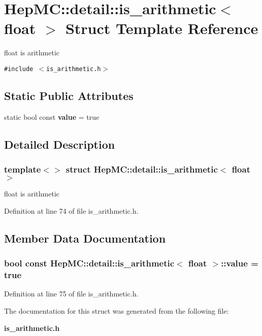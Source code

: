 \section{Hep\-MC::detail::is\_\-arithmetic$<$ float $>$ Struct Template Reference}
\label{structHepMC_1_1detail_1_1is__arithmetic_3_01float_01_4}
float is arithmetic  


{\tt \#include $<$is\_\-arithmetic.h$>$}

\subsection*{Static Public Attributes}
\begin{CompactItemize}
\item 
static bool const {\bf value} = true
\end{CompactItemize}


\subsection{Detailed Description}
\subsubsection*{template$<$$>$ struct Hep\-MC::detail::is\_\-arithmetic$<$ float $>$}

float is arithmetic 



Definition at line 74 of file is\_\-arithmetic.h.

\subsection{Member Data Documentation}
\subsubsection{\setlength{\rightskip}{0pt plus 5cm}bool const {\bf Hep\-MC::detail::is\_\-arithmetic}$<$ float $>$::{\bf value} = true\hspace{0.3cm}{\tt  [static]}}\label{structHepMC_1_1detail_1_1is__arithmetic_3_01float_01_4_ead3df450e02b59ea9cda6b63728adbe}




Definition at line 75 of file is\_\-arithmetic.h.

The documentation for this struct was generated from the following file:\begin{CompactItemize}
\item 
{\bf is\_\-arithmetic.h}\end{CompactItemize}
